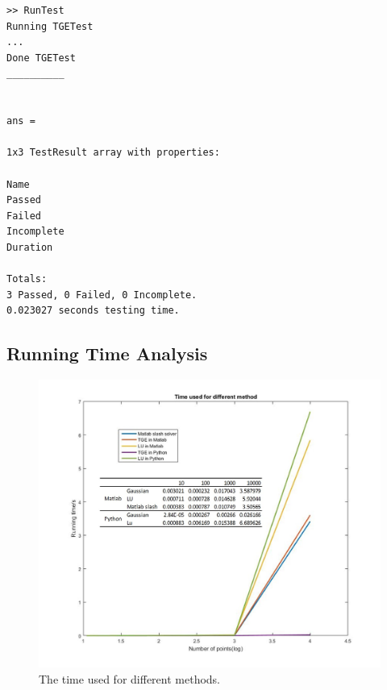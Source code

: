 \documentclass{article}
\begin{document}
  \begin{lstlisting}[frame=single]  
>> RunTest
Running TGETest
...
Done TGETest
__________


ans = 

1x3 TestResult array with properties:

Name
Passed
Failed
Incomplete
Duration

Totals:
3 Passed, 0 Failed, 0 Incomplete.
0.023027 seconds testing time.
  \end{lstlisting}

\subsection{Running Time Analysis}

\begin{figure}[h]
\centering
\includegraphics[width=1\linewidth]{../figures/Time_all_Table}
\caption{The time used for different methods.}
\label{fig:Time_all_Table}
\end{figure}
\end{document}
